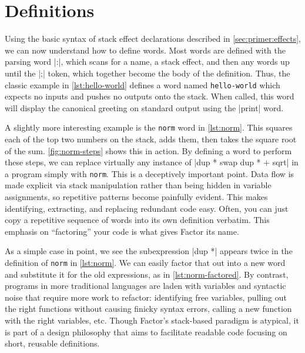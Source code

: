 \section{Definitions}\label{sec:primer:colon-defs}



Using the basic syntax of stack effect declarations described in
\cref{sec:primer:effects}, we can now understand how to define words.  Most
words are defined with the parsing word \factor|:|, which scans for a name, a
stack effect, and then any words up until the \factor|;| token, which together
become the body of the definition.  Thus, the classic example in
\cref{lst:hello-world} defines a word named \Verb|hello-world| which expects
no inputs and pushes no outputs onto the stack.  When called, this word will
display the canonical greeting on standard output using the \factor|print|
word.


A slightly more interesting example is the \Verb|norm| word in
\cref{lst:norm}.  This squares each of the top two numbers on the stack, adds
them, then takes the square root of the sum.  \cref{fig:norm-steps} shows this
in action.  By defining a word to perform these steps, we can replace virtually
any instance of
%
\factor|dup * swap dup * + sqrt|
%
in a program simply with \Verb|norm|.  This is a deceptively important point.
Data flow is made explicit via stack manipulation rather than being hidden in
variable assignments, so repetitive patterns become painfully evident.  This
makes identifying, extracting, and replacing redundant code easy.  Often, you
can just copy a repetitive sequence of words into its own definition verbatim.
This emphasis on ``factoring'' your code is what gives Factor its name.


As a simple case in point, we see the subexpression \factor|dup *| appears
twice in the definition of \Verb|norm| in \cref{lst:norm}.  We can easily
factor that out into a new word and substitute it for the old expressions, as
in \cref{lst:norm-factored}.  By contrast, programs in more traditional
languages are laden with variables and syntactic noise that require more work
to refactor: identifying free variables, pulling out the right functions
without causing finicky syntax errors, calling a new function with the right
variables, etc.  Though Factor's stack-based paradigm is atypical, it is part
of a design philosophy that aims to facilitate readable code focusing on short,
reusable definitions.

